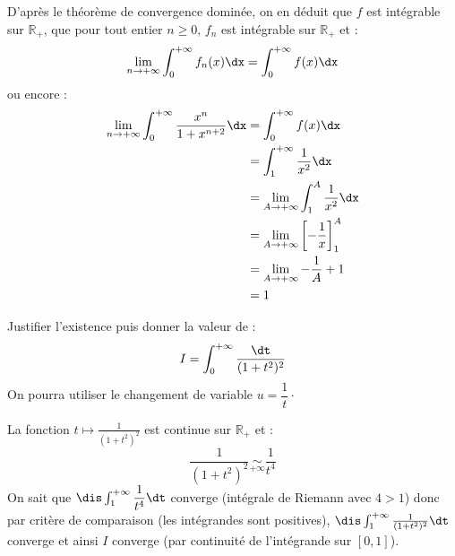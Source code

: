 \documentclass[a4paper,10pt]{report}
\begin{document}
D'après le théorème de convergence dominée, on en déduit que $f$ est intégrable sur $\mathbb{R}_+$, que pour tout entier $n \geq 0$, $f_n$ est intégrable sur $\mathbb{R}_+$ et :
$$ \lim_{n \rightarrow + \infty} \int_0^{+ \infty} f_n(x) \dx = \int_0^{+ \infty} f(x) \dx$$
ou encore :
\begin{align*}
\lim_{n \rightarrow + \infty} \int_0^{+ \infty} \dfrac{x^n}{1+x^{n+2}} \dx & = \int_0^{+ \infty} f(x) \dx \\
& = \int_1^{+ \infty} \dfrac{1}{x^2} \dx \\
& = \lim_{A \rightarrow + \infty} \int_1^{A} \dfrac{1}{x^2} \dx \\
& = \lim_{A \rightarrow + \infty} \left[ - \dfrac{1}{x} \right]_1^A \\
& = \lim_{A \rightarrow + \infty} - \dfrac{1}{A} + 1 \\
& = 1
\end{align*}


\begin{Exa} Justifier l'existence puis donner la valeur de :
  \[
  I = \int_{0}^{ + \infty} \frac{\dt}{(1 + t^{2})^{2}}
  \]
On pourra utiliser le changement de variable $u = \dfrac{1}{t} \cdot$
\end{Exa}

\corr La fonction $t \mapsto \frac{1}{(1 + t^{2})^{2}}$ est continue sur $\mathbb{R}_+$ et :
$$ \frac{1}{(1 + t^{2})^{2}} \underset{+ \infty}{\sim} \dfrac{1}{t^4}$$
On sait que $\dis \int_1^{+ \infty} \dfrac{1}{t^4} \dt$ converge (intégrale de Riemann avec $4>1$) donc par critère de comparaison (les intégrandes sont positives), $\dis  \int_1^{+ \infty}  \frac{1}{(1 + t^{2})^{2}} \dt$ converge et ainsi $I$ converge (par continuité de l'intégrande sur $[0,1]$).

\medskip
\end{document}
